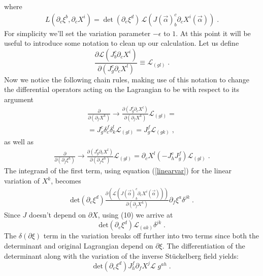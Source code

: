 \documentclass[%
 reprint,
 amsmath,amssymb,
 aps,
]{revtex4-1}
\begin{document}
where
\begin{eqnarray}
    L(\partial_c \xi^b, \partial_c X^i) = \mathrm{\det}( \partial_e \xi^d )
    \, \mathcal{L}( J(\vec{\alpha})^c_b \partial_c X^i(\vec{\alpha}) )\;.  \nonumber
\end{eqnarray}
For simplicity we'll set the variation parameter $-\epsilon$ to $1$.
At this point it will be useful to introduce some notation to clean up our calculation.  Let us define
\begin{equation}
    \frac{\partial \mathcal{L}(J^c_b \partial_c X^i)}{\partial (J^c_g \partial_c X^l)} \equiv \mathcal{L}_{(g l)} \; . \nonumber
\end{equation}
Now we notice the following chain rules, making use of this notation to change the differential operators acting
on the Lagrangian to be with respect to its argument
\begin{gather}
    \frac{\partial}{\partial(\partial_f X^k)} \rightarrow
    \frac{\partial(J^c_g \partial_c X^l)}{\partial (\partial_f X^k)}
    \mathcal{L}_{(g l)} = \nonumber \\
    = J^c_g \delta^f_c \delta^l_k \mathcal{L}_{(g l)}= J^f_g \mathcal{L}_{(g k)} \; ,
\end{gather}
as well as
\begin{gather}
\label{chainrulexi}
    \frac{\partial}{\partial (\partial_f \xi^h)} \rightarrow
    \frac{\partial (J^c_g \partial_c X^l)}{\partial (\partial_f \xi^h)} \mathcal{L}_{(g l)}
    = \partial_c X^l (-J^c_h J^f_g)  \mathcal{L}_{(g l)} \; .
\end{gather}
The integrand of the first term, using equation (\ref{linearvar}) for
the linear variation of $X^k$, becomes
\begin{eqnarray}
    \mathrm{det}(\partial_e \xi^d)
    \frac{\partial \left(
    \mathcal{L}( J(\vec{\alpha})^c_b \partial_c X^i(\vec{\alpha}) )
    \right)}{\partial \left(  \partial_f X^k \right)} \partial_f \xi^a \delta^{j k} \; . \nonumber
\end{eqnarray}
Since $J$ doesn't depend on $\partial X$, using (10) we arrive at
\begin{equation}
\label{term1}
    \mathrm{det} ( \partial_e \xi^d ) \mathcal{L}_{(a k)} \delta^{j k} \; .
\end{equation}
The $\delta (\partial\xi)$ term in the variation breaks off further into two terms since both the determinant and original
Lagrangian depend on $\partial \xi$. The differentiation of the determinant along with the variation of the inverse
St\"uckelberg field yields:
\begin{equation}
\label{term2}
    \mathrm{det} ( \partial_e \xi^d ) J^f_h \partial_f X^j \mathcal{L} \; g^{a h} \; .
\end{equation}
\end{document}
